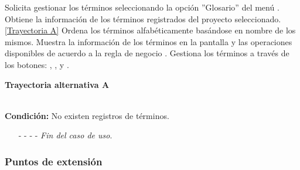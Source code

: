 \begin{UCtrayectoria}
	\UCpaso[\UCactor] Solicita gestionar los términos seleccionando la opción ''Glosario'' del menú .
	\UCpaso[\UCsist] Obtiene la información de los términos registrados del proyecto seleccionado. \hyperlink{CU6:TAA}{[Trayectoria A]}
	\UCpaso[\UCsist] Ordena los términos alfabéticamente basándose en nombre de los mismos.
	\UCpaso[\UCsist] Muestra la información de los términos en la pantalla  y las operaciones disponibles de acuerdo a la regla de negocio .\label{CU6-P4}
	\UCpaso[\UCactor] Gestiona los términos a través de los botones: , \editar, \eliminar y . 
\end{UCtrayectoria}		
\hypertarget{CU6:TAA}{\textbf{Trayectoria alternativa A}}\\
\noindent \textbf{Condición:} No existen registros de términos.
\begin{enumerate}
	\UCpaso[\UCsist] Muestra el mensaje  en la pantalla  para indicar que no hay registros de términos para mostrar. \label{CU6-TA1}
	\UCpaso[\UCactor] Gestiona los términos a través del botón: . 
	\item[- -] - - {\em {Fin del caso de uso}}.%
\end{enumerate}


\subsubsection{Puntos de extensión}

